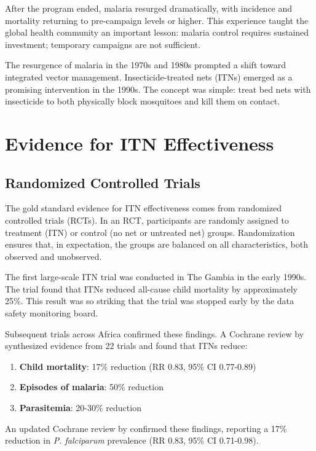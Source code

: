 After the program ended, malaria resurged dramatically, with incidence and mortality returning to pre-campaign levels or higher. This experience taught the global health community an important lesson: malaria control requires sustained investment; temporary campaigns are not sufficient.

The resurgence of malaria in the 1970s and 1980s prompted a shift toward integrated vector management. Insecticide-treated nets (ITNs) emerged as a promising intervention in the 1990s. The concept was simple: treat bed nets with insecticide to both physically block mosquitoes and kill them on contact.

\section{Evidence for ITN Effectiveness}

\subsection{Randomized Controlled Trials}

The gold standard evidence for ITN effectiveness comes from randomized controlled trials (RCTs). In an RCT, participants are randomly assigned to treatment (ITN) or control (no net or untreated net) groups. Randomization ensures that, in expectation, the groups are balanced on all characteristics, both observed and unobserved.

The first large-scale ITN trial was conducted in The Gambia in the early 1990s. The trial found that ITNs reduced all-cause child mortality by approximately 25\%. This result was so striking that the trial was stopped early by the data safety monitoring board.

Subsequent trials across Africa confirmed these findings. A Cochrane review by \citet{lengeler2004insecticide} synthesized evidence from 22 trials and found that ITNs reduce:

\begin{enumerate}
	\item \textbf{Child mortality}: 17\% reduction (RR 0.83, 95\% CI 0.77-0.89)
	\item \textbf{Episodes of malaria}: 50\% reduction
	\item \textbf{Parasitemia}: 20-30\% reduction
\end{enumerate}

An updated Cochrane review by \citet{pryce2018insecticide} confirmed these findings, reporting a 17\% reduction in \textit{P. falciparum} prevalence (RR 0.83, 95\% CI 0.71-0.98).

